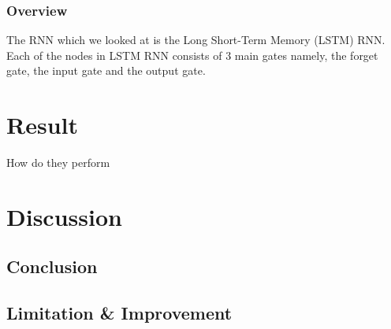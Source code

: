 \documentclass[11pt, oneside]{article}   	%
\begin{document}
\subsubsection{Overview}
The RNN which we looked at is the Long Short-Term Memory (LSTM) RNN. Each of the nodes in LSTM RNN consists of 3 main gates namely, the forget gate, the input gate and the output gate.  



\section{Result}
How do they perform

\section{Discussion}
\subsection{Conclusion}
 \subsection{Limitation \& Improvement}
\end{document}
